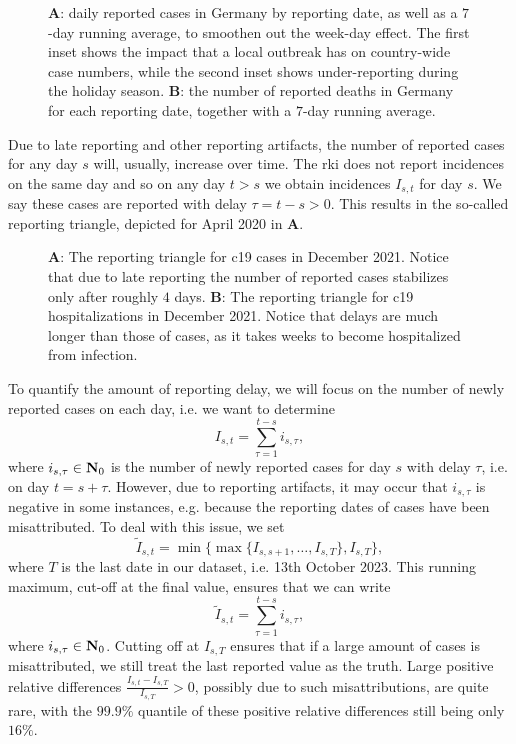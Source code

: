 \begin{figure}
    \resizebox{\textwidth}{!}{%
    }
    \caption{\textbf{A}: daily reported cases in Germany by reporting date, as well as a $7$-day running average, to smoothen out the week-day effect. The first inset shows the impact that a local outbreak \citep{Gunther2020SARSCoV2} has on country-wide case numbers, while the second inset shows under-reporting during the holiday season.  \textbf{B}: the number of reported deaths in Germany for each reporting date, together with a $7$-day running average.}
    \label{fig:cases_germany}
\end{figure}



Due to late reporting and other reporting artifacts, the number of reported cases for any day $s$ will, usually, increase over time. The \acrshort{rki} does not report incidences on the same day and so on any day $t > s$ we obtain incidences $I_{s,t}$ for day $s$. We say these cases are reported with delay $\tau = t -s > 0$. This results in the so-called reporting triangle, depicted for April 2020 in  \textbf{A}. 

\begin{figure}
    \resizebox{\textwidth}{!}{%
    }
    \caption{\textbf{A}: The reporting triangle for \acrshort{c19} cases in December 2021. Notice that due to late reporting the number of reported cases stabilizes only after roughly $4$ days. \textbf{B}: The reporting triangle for \acrshort{c19} hospitalizations in December 2021. Notice that delays are much longer than those of cases, as it takes weeks to become hospitalized from infection.}
    \label{fig:reporting_delays_cases}
\end{figure}

To quantify the amount of reporting delay, we will focus on the number of newly reported cases on each day, i.e. we want to determine
$$
    I_{s,t} = \sum_{\tau = 1}^{t - s} i_{s,\tau},
$$
where $i_{s,\tau} \in \mathbf N_{0}$ is the number of newly reported cases for day $s$ with delay $\tau$, i.e. on day $t = s + \tau$. However, due to reporting artifacts, it may occur that $i_{s,\tau}$ is negative in some instances, e.g. because the reporting dates of cases have been misattributed. To deal with this issue, we set 
$$
    \tilde I_{s,t} = \min \{\max \{I_{s,s + 1}, \dots, I_{s, T}\}, I_{s, T}\},
$$
where $T$ is the last date in our dataset, i.e. 13th October 2023. This running maximum, cut-off at the final value, ensures that we can write 
$$
    \tilde I_{s,t} =  \sum_{\tau = 1}^{t - s} i_{s,\tau},
$$
where $i_{s,\tau} \in \mathbf N_0$. Cutting off at $I_{s,T}$ ensures that if a large amount of cases is misattributed, we still treat the last reported value as the truth. Large positive relative differences $ \frac{I_{s, t} - I_{s,T}}{I_{s,T}} > 0$, possibly due to such misattributions, are quite rare, with the $99.9\%$ quantile of these positive relative differences still being only $16\%$.


